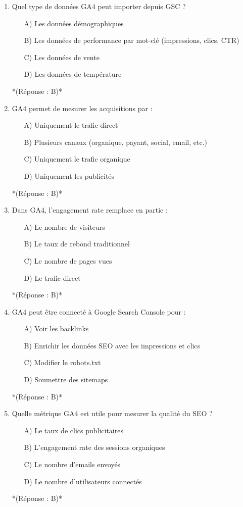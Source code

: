 \documentclass[12pt,a4paper,twoside]{report}
\begin{document}
\begin{enumerate}
    \item Quel type de données GA4 peut importer depuis GSC ?
    \begin{itemize}
        \item[A)] Les données démographiques
        \item[B)] Les données de performance par mot-clé (impressions, clics, CTR)
        \item[C)] Les données de vente
        \item[D)] Les données de température
    \end{itemize}
    *(Réponse : B)*

    \item GA4 permet de mesurer les acquisitions par :
    \begin{itemize}
        \item[A)] Uniquement le trafic direct
        \item[B)] Plusieurs canaux (organique, payant, social, email, etc.)
        \item[C)] Uniquement le trafic organique
        \item[D)] Uniquement les publicités
    \end{itemize}
    *(Réponse : B)*

    \item Dans GA4, l'engagement rate remplace en partie :
    \begin{itemize}
        \item[A)] Le nombre de visiteurs
        \item[B)] Le taux de rebond traditionnel
        \item[C)] Le nombre de pages vues
        \item[D)] Le trafic direct
    \end{itemize}
    *(Réponse : B)*

    \item GA4 peut être connecté à Google Search Console pour :
    \begin{itemize}
        \item[A)] Voir les backlinks
        \item[B)] Enrichir les données SEO avec les impressions et clics
        \item[C)] Modifier le robots.txt
        \item[D)] Soumettre des sitemaps
    \end{itemize}
    *(Réponse : B)*

    \item Quelle métrique GA4 est utile pour mesurer la qualité du SEO ?
    \begin{itemize}
        \item[A)] Le taux de clics publicitaires
        \item[B)] L'engagement rate des sessions organiques
        \item[C)] Le nombre d'emails envoyés
        \item[D)] Le nombre d'utilisateurs connectés
    \end{itemize}
    *(Réponse : B)*


\end{enumerate}
\end{document}
